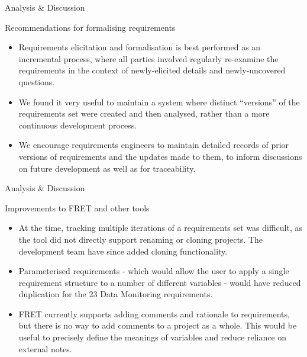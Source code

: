 \documentclass[11pt, aspectratio=169, table]{beamer}
\begin{document}
\begin{frame}{Analysis \& Discussion}
\begin{block}{Recommendations for formalising requirements}
\begin{itemize}
	\item Requirements elicitation and formalisation is best performed as an incremental process, where all parties involved regularly re-examine the requirements in the context of newly-elicited details and newly-uncovered questions.
	
	\item We found it very useful to maintain a system where distinct ``versions'' of the requirements set were created and then analysed, rather than a more continuous development process.
	
	\item We encourage requirements engineers to maintain detailed records of prior versions of requirements and the updates made to them, to inform discussions on future development as well as for traceability.
\end{itemize}
\end{block}
\end{frame}


\begin{frame}{Analysis \& Discussion}
\begin{block}{Improvements to FRET and other tools}
\begin{itemize}
	\item At the time, tracking multiple iterations of a \fretish requirements set was difficult, as the tool did not directly support renaming or cloning projects. The development team have since added cloning functionality.
	
	\item Parameterised requirements - which would allow the user to apply a single requirement structure to a number of different variables - would have reduced duplication for the 23 Data Monitoring requirements.
	
	\item FRET currently supports adding comments and rationale to requirements, but there is no way to add comments to a project as a whole. This would be useful to precisely define the meanings of variables and reduce reliance on external notes.
\end{itemize}
\end{block}
\end{frame}
\end{document}
